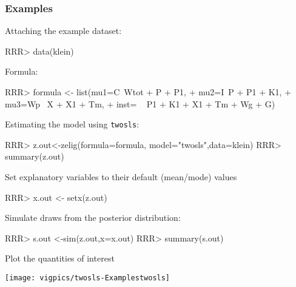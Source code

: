 \subsubsection{Examples}
 Attaching the example dataset:
\begin{Schunk}
\begin{Sinput}
RRR>  data(klein)
\end{Sinput}
\end{Schunk}
 Formula:
\begin{Schunk}
\begin{Sinput}
RRR>  formula <- list(mu1=C~Wtot + P + P1,
+                mu2=I~P + P1 + K1,
+                mu3=Wp~ X + X1 + Tm,
+                inst= ~ P1 + K1 + X1 + Tm + Wg + G)
\end{Sinput}
\end{Schunk}
Estimating the model using \texttt{twosls}:
\begin{Schunk}
\begin{Sinput}
RRR>  z.out<-zelig(formula=formula, model="twosls",data=klein)
RRR>  summary(z.out)
\end{Sinput}
\end{Schunk}

Set explanatory variables to their default (mean/mode) values
\begin{Schunk}
\begin{Sinput}
RRR>  x.out <- setx(z.out)
\end{Sinput}
\end{Schunk}

Simulate draws from the posterior distribution:
\begin{Schunk}
\begin{Sinput}
RRR> s.out <-sim(z.out,x=x.out)
RRR>  summary(s.out)
\end{Sinput}
\end{Schunk}
Plot the quantities of interest
\begin{center}
\texttt{[image: vigpics/twosls-Examplestwosls]}
\end{center}
 
\clearpage
